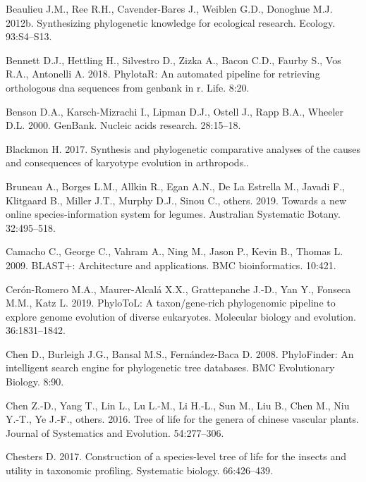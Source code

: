 \documentclass[]{article}
\begin{document}
\leavevmode\hypertarget{ref-beaulieu2012synthesizing}{}%
Beaulieu J.M., Ree R.H., Cavender-Bares J., Weiblen G.D., Donoghue M.J. 2012b. Synthesizing phylogenetic knowledge for ecological research. Ecology. 93:S4--S13.

\leavevmode\hypertarget{ref-bennett2018phylotar}{}%
Bennett D.J., Hettling H., Silvestro D., Zizka A., Bacon C.D., Faurby S., Vos R.A., Antonelli A. 2018. PhylotaR: An automated pipeline for retrieving orthologous dna sequences from genbank in r. Life. 8:20.

\leavevmode\hypertarget{ref-benson2000genbank}{}%
Benson D.A., Karsch-Mizrachi I., Lipman D.J., Ostell J., Rapp B.A., Wheeler D.L. 2000. GenBank. Nucleic acids research. 28:15--18.

\leavevmode\hypertarget{ref-blackmon2017synthesis}{}%
Blackmon H. 2017. Synthesis and phylogenetic comparative analyses of the causes and consequences of karyotype evolution in arthropods..

\leavevmode\hypertarget{ref-bruneau2019towards}{}%
Bruneau A., Borges L.M., Allkin R., Egan A.N., De La Estrella M., Javadi F., Klitgaard B., Miller J.T., Murphy D.J., Sinou C., others. 2019. Towards a new online species-information system for legumes. Australian Systematic Botany. 32:495--518.

\leavevmode\hypertarget{ref-camacho2009blast}{}%
Camacho C., George C., Vahram A., Ning M., Jason P., Kevin B., Thomas L. 2009. BLAST+: Architecture and applications. BMC bioinformatics. 10:421.

\leavevmode\hypertarget{ref-ceron2019phylotol}{}%
Cerón-Romero M.A., Maurer-Alcalá X.X., Grattepanche J.-D., Yan Y., Fonseca M.M., Katz L. 2019. PhyloToL: A taxon/gene-rich phylogenomic pipeline to explore genome evolution of diverse eukaryotes. Molecular biology and evolution. 36:1831--1842.

\leavevmode\hypertarget{ref-chen2008phylofinder}{}%
Chen D., Burleigh J.G., Bansal M.S., Fernández-Baca D. 2008. PhyloFinder: An intelligent search engine for phylogenetic tree databases. BMC Evolutionary Biology. 8:90.

\leavevmode\hypertarget{ref-chen2016tree}{}%
Chen Z.-D., Yang T., Lin L., Lu L.-M., Li H.-L., Sun M., Liu B., Chen M., Niu Y.-T., Ye J.-F., others. 2016. Tree of life for the genera of chinese vascular plants. Journal of Systematics and Evolution. 54:277--306.

\leavevmode\hypertarget{ref-chesters2017construction}{}%
Chesters D. 2017. Construction of a species-level tree of life for the insects and utility in taxonomic profiling. Systematic biology. 66:426--439.
\end{document}
